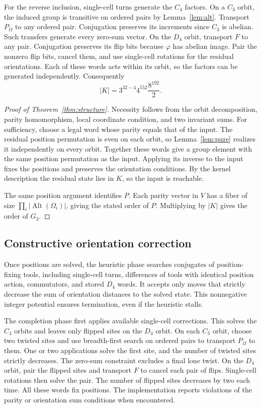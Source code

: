 \documentclass[a4paper,11pt]{article}
\theoremstyle{definition}
\newcommand{\Alt}{\operatorname{Alt}}
\begin{document}
For the reverse inclusion, single-cell turns generate the $C_4$
factors. On a $C_3$ orbit, the induced group is transitive on ordered
pairs by Lemma~\ref{lem:alt}. Transport $P_\Omega$ to any ordered pair.
Conjugation preserves its increments since $C_3$ is abelian.
Such transfers generate every zero-sum vector. On the $D_4$ orbit,
transport $F$ to any pair. Conjugation preserves its flip bits because
$\varphi$ has abelian image. Pair the nonzero flip bits, cancel them,
and use single-cell rotations for the residual orientations.
Each of these words acts within its orbit, so the factors can be
generated independently. Consequently
\[
|K|=3^{32-4}4^{552}\frac{8^{192}}2 .
\]

\begin{proof}[Proof of Theorem~\ref{thm:structure}]
Necessity follows from the orbit decomposition, parity homomorphism,
local coordinate condition, and two invariant sums.
For sufficiency, choose a legal word whose parity equals that of the
input. The residual position permutation is even on each orbit, so
Lemma~\ref{lem:pure} realizes it independently on every orbit.
Together these words give a group element with the same position
permutation as the input. Applying its inverse to the input fixes the
positions and preserves the orientation conditions. By the kernel
description the residual state lies in $K$, so the input is reachable.

The same position argument identifies $P$. Each parity vector in
$V$ has a fiber of size $\prod_i|\Alt(\Omega_i)|$, giving the stated
order of $P$. Multiplying by $|K|$ gives the order of $G_3$.
\end{proof}

\subsection{Constructive orientation correction}
Once positions are solved, the heuristic phase searches conjugates
of position-fixing tools, including single-cell turns, differences
of tools with identical position action, commutators, and stored
$D_4$ words. It accepts only moves that strictly decrease the sum of
orientation distances to the solved state. This nonnegative integer
potential ensures termination, even if the heuristic stalls.

The completion phase first applies available single-cell corrections.
This solves the $C_4$ orbits and leaves only flipped sites on the
$D_4$ orbit. On each $C_3$ orbit, choose two twisted sites and use
breadth-first search on ordered pairs to transport $P_\Omega$ to them.
One or two applications solve the first site, and the number of
twisted sites strictly decreases. The zero-sum constraint excludes
a final lone twist. On the $D_4$ orbit, pair the flipped sites and
transport $F$ to cancel each pair of flips. Single-cell rotations
then solve the pair. The number of flipped sites decreases by two
each time. All these words fix positions.
The implementation reports violations of the parity or orientation
sum conditions when encountered.
\end{document}
